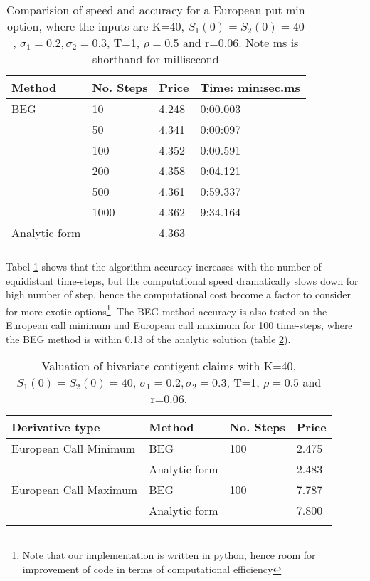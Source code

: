 \begin{table}[th]
\caption{Comparision of speed and accuracy for a European put min option, where the inputs are K=40, $S_1(0)=S_2(0)=40$, $\sigma_1=0.2, \sigma_2=0.3$, T=1, $\rho=0.5$  and r=0.06. Note ms is shorthand for millisecond}
\label{tab:TradeOffEuroMin}
\centering
\begin{tabular}{l l l l}
\toprule
\textbf{Method} & \textbf{No. Steps} & \textbf{Price} & \textbf{Time: min:sec.ms} \\
\midrule
BEG & 10 & 4.248 & 0:00.003\\
& 50 & 4.341 & 0:00:097\\
& 100 & 4.352 & 0:00.591\\
& 200 & 4.358 & 0:04.121\\
& 500 & 4.361 & 0:59.337\\
& 1000 & 4.362 & 9:34.164\\
Analytic form & & 4.363 & \\
\bottomrule\\
\end{tabular}
\end{table}
Tabel \ref{tab:TradeOffEuroMin} shows that the algorithm accuracy increases with the number of equidistant time-steps, but the computational speed dramatically slows down for high number of step, hence the computational cost become a factor to consider for more exotic options\footnote{Note that our implementation is written in python, hence room for improvement of code in terms of computational efficiency}. The BEG method accuracy is also tested on the European call minimum and European call maximum for 100 time-steps, where the BEG method is within 0.13 of the analytic solution (table \ref{tab:PriceEuropean}).\\
\begin{table}[th]
\caption{Valuation of bivariate contigent claims with K=40, $S_1(0)=S_2(0)=40$, $\sigma_1=0.2, \sigma_2=0.3$, T=1, $\rho=0.5$  and r=0.06.}
\label{tab:PriceEuropean}
\centering
\begin{tabular}{l l l l}
\toprule
\textbf{Derivative type} & \textbf{Method} & \textbf{No. Steps} & \textbf{Price} \\
\midrule
European Call Minimum & BEG & 100 & 2.475\\
& Analytic form & & 2.483\\
European Call Maximum & BEG & 100 & 7.787\\
& Analytic form & & 7.800\\
\bottomrule\\
\end{tabular}
\end{table}
 
